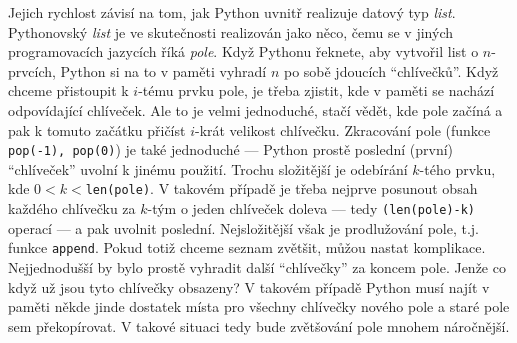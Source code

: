 Jejich rychlost závisí na tom, jak Python uvnitř realizuje datový typ \emph{list}. Pythonovský \emph{list} je ve skutečnosti realizován 
jako něco, čemu se v jiných programovacích jazycích říká \emph{pole}. Když Pythonu řeknete, aby vytvořil list o 
$n$-prvcích, Python si na to v paměti vyhradí $n$ po sobě jdoucích ``chlívečků''. Když chceme přistoupit k $i$-tému prvku pole, je třeba
zjistit, kde v paměti se nachází odpovídající chlíveček. Ale to je velmi jednoduché, stačí vědět, kde pole začíná a pak k tomuto začátku přičíst
$i$-krát velikost chlívečku. Zkracování pole (funkce {\tt pop(-1), pop(0)}) je také jednoduché --- Python prostě poslední (první) ``chlíveček'' uvolní k
jinému použití. Trochu složitější je odebírání $k$-tého prvku, kde $0<k<${\tt len(pole)}. V takovém případě je třeba nejprve posunout obsah každého
chlívečku za $k$-tým o jeden chlíveček doleva --- tedy {\tt (len(pole)-k)} operací --- a pak uvolnit poslední. Nejsložitější však je prodlužování
pole, t.j. funkce {\tt append}. Pokud totiž chceme seznam zvětšit, můžou nastat komplikace. Nejjednodušší by bylo
prostě vyhradit další ``chlívečky'' za koncem pole. Jenže co když už jsou tyto chlívečky obsazeny? V takovém případě Python musí najít v paměti
někde jinde dostatek místa pro všechny chlívečky nového pole a staré pole sem překopírovat. V takové situaci tedy bude zvětšování pole mnohem náročnější.

